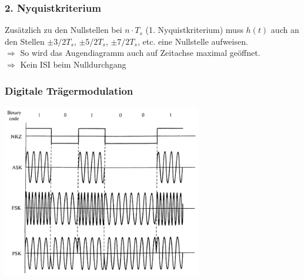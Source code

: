 \subsubsection{2. Nyquistkriterium}
	Zusätzlich zu den Nullstellen bei $n\cdot T_s$ (1. Nyquistkriterium) muss $h(t)$ auch an den Stellen $\pm 3/2 T_s$, $\pm 5/2T_s$, $\pm 7/2 T_s$, etc. eine Nullstelle aufweisen.\\
	$\Rightarrow$ So wird das Augendiagramm auch auf Zeitachse maximal geöffnet. \\
	$\Rightarrow$ Kein ISI beim Nulldurchgang


\subsubsection{Digitale Trägermodulation }
\begin{minipage}{9cm}
	\includegraphics[width=8.7cm]{bilder/dig_traegermodulation.png}
\end{minipage}
